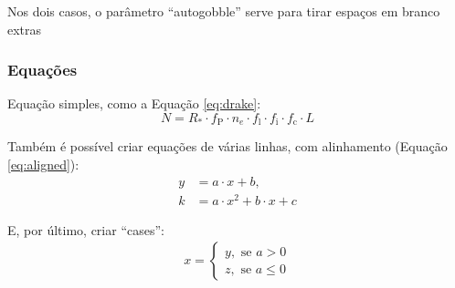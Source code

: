         Nos dois casos, o parâmetro ``autogobble'' serve para tirar espaços em branco extras

      \subsubsection{Equações}
        Equação simples, como a Equação \eqref{eq:drake}:
        \begin{equation}
          N = R_* \cdot f_\text{P} \cdot n_e \cdot f_\text{l} \cdot f_\text{i} \cdot f_\text{c} \cdot L
          \label{eq:drake}
        \end{equation}

        Também é possível criar equações de várias linhas, com alinhamento (Equação \eqref{eq:aligned}):
        \begin{align}
          y &= a \cdot x + b, \\
          k &= a \cdot x^2 + b \cdot x + c
          \label{eq:aligned}
        \end{align}

        E, por último, criar ``cases'':
        \begin{align}
          x =
          \begin{cases}
            y,\text{ se } a > 0 \\
            z,\text{ se } a \leq 0
          \end{cases}
        \end{align}







